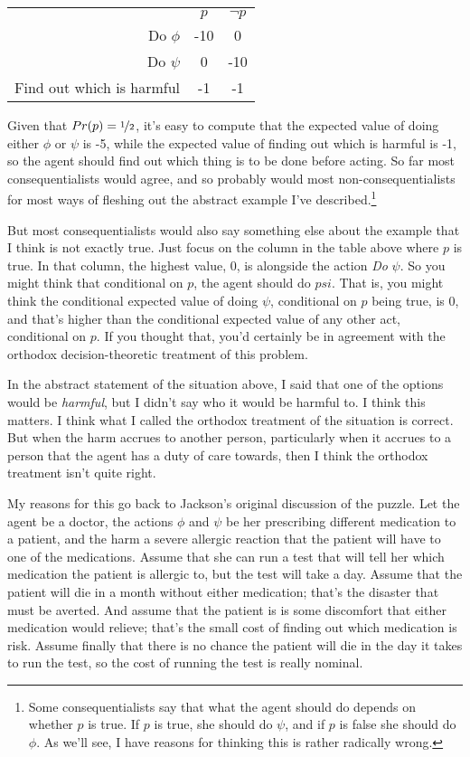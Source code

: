 \begin{tabular}{r c c}
 & \(p\) & \(\neg p\) \\
Do \(\phi\) & -10 & 0 \\
Do \(\psi\) & 0 & -10 \\
Find out which is harmful & -1 & -1 \\
\end{tabular}

\noindent Given that \(Pr(p) = \nicefrac{1}{2}\), it's easy to compute that the expected value of doing either \(\phi\) or \(\psi\) is -5, while the expected value of finding out which is harmful is -1, so the agent should find out which thing is to be done before acting. So far most consequentialists would agree, and so probably would most non-consequentialists for most ways of fleshing out the abstract example I've described.\footnote{Some consequentialists say that what the agent should do depends on whether \(p\) is true. If \(p\) is true, she should do \(\psi\), and if \(p\) is false she should do \(\phi\). As we'll see, I have reasons for thinking this is rather radically wrong.}

But most consequentialists would also say something else about the example that I think is not exactly true. Just focus on the column in the table above where \(p\) is true. In that column, the highest value, 0, is alongside the action \textit{Do} \(\psi\). So you might think that conditional on \(p\), the agent should do \(psi\). That is, you might think the conditional expected value of doing \(\psi\), conditional on \(p\) being true, is 0, and that's higher than the conditional expected value of any other act, conditional on \(p\). If you thought that, you'd certainly be in agreement with the orthodox decision-theoretic treatment of this problem.

In the abstract statement of the situation above, I said that one of the options would be \textit{harmful}, but I didn't say who it would be harmful to. I think this matters. I think what I called the orthodox treatment of the situation is correct. But when the harm accrues to another person, particularly when it accrues to a person that the agent has a duty of care towards, then I think the orthodox treatment isn't quite right.

My reasons for this go back to Jackson's original discussion of the puzzle. Let the agent be a doctor, the actions \(\phi\) and \(\psi\) be her prescribing different medication to a patient, and the harm a severe allergic reaction that the patient will have to one of the medications. Assume that she can run a test that will tell her which medication the patient is allergic to, but the test will take a day. Assume that the patient will die in a month without either medication; that's the disaster that must be averted. And assume that the patient is is some discomfort that either medication would relieve; that's the small cost of finding out which medication is risk. Assume finally that there is no chance the patient will die in the day it takes to run the test, so the cost of running the test is really nominal.

